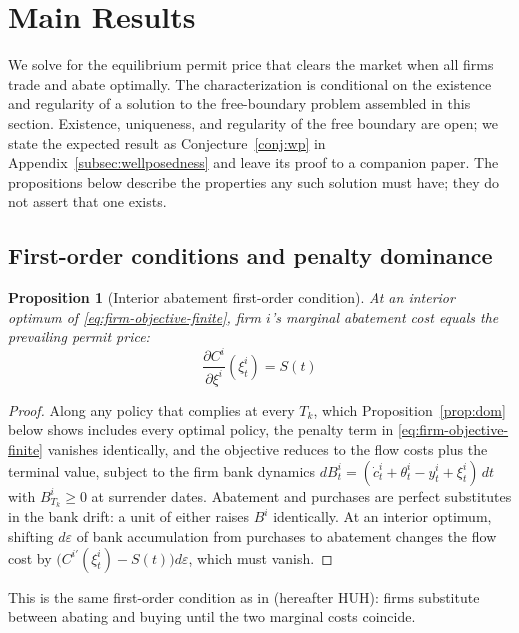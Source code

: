 \documentclass[11pt,letterpaper]{article}
\theoremstyle{plain}
\newtheorem{proposition}[theorem]{Proposition}
\theoremstyle{definition}
\numberwithin{equation}{section}
\begin{document}
\section{Main Results}\label{sec:results}
We solve for the equilibrium permit price that clears the market when all firms trade and abate optimally. The characterization is conditional on the existence and regularity of a solution to the free-boundary problem assembled in this section. Existence, uniqueness, and regularity of the free boundary are open; we state the expected result as Conjecture~\ref{conj:wp} in Appendix~\ref{subsec:wellposedness} and leave its proof to a companion paper. The propositions below describe the properties any such solution must have; they do not assert that one exists.

\subsection{First-order conditions and penalty dominance}\label{sec:dominance}

\begin{proposition}[Interior abatement first-order condition]\label{prop:optabat}
At an interior optimum of \eqref{eq:firm-objective-finite}, firm $i$'s marginal abatement cost equals the prevailing permit price:
\begin{equation}\label{eq:optabat}
\frac{\partial C^i}{\partial \xi^i}(\xi_t^i) = S(t)
\end{equation} 
\end{proposition}
\begin{proof}
Along any policy that complies at every $T_k$, which Proposition~\ref{prop:dom} below shows includes every optimal policy, the penalty term in \eqref{eq:firm-objective-finite} vanishes identically, and the objective reduces to the flow costs plus the terminal value, subject to the firm bank dynamics $dB^i_t=(\dot c^i_t+\theta^i_t-y^i_t+\xi^i_t)\,dt$ with $B^i_{T_k}\ge0$ at surrender dates. Abatement and purchases are perfect substitutes in the bank drift: a unit of either raises $B^i$ identically. At an interior optimum, shifting $d\varepsilon$ of bank accumulation from purchases to abatement changes the flow cost by $\bigl(C^{i\prime}(\xi^i_t)-S(t)\bigr)d\varepsilon$, which must vanish.
\end{proof}
This is the same first-order condition as in \citet{hitzemann2018} (hereafter HUH): firms substitute between abating and buying until the two marginal costs coincide.
\end{document}
